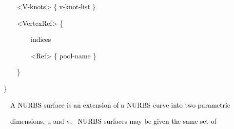\documentclass[a4paper]{article}
\newcommand\textstyleOOoComputerKeyWord[1]{\textrm{\textcolor[rgb]{0.0,0.0,0.5019608}{#1}}}
\newcommand\textstyleOOoAssemblerSpecialChar[1]{\textrm{\textcolor[rgb]{0.0,0.5019608,0.0}{#1}}}
\newcommand\textstyleOOoAssemblerIdent[1]{\textrm{\textcolor{black}{#1}}}
\newcommand\textstyleOOoAssemblerDirective[1]{\textrm{\textcolor[rgb]{0.0,0.5019608,1.0}{#1}}}
\begin{document}
{\color{black}
\textstyleOOoComputerKeyWord{\textcolor{black}{\ \ \ \ }}\textstyleOOoAssemblerSpecialChar{{\textless}}\textstyleOOoAssemblerIdent{V}\textstyleOOoAssemblerSpecialChar{{}-}\textstyleOOoAssemblerIdent{knots}\textstyleOOoAssemblerSpecialChar{{\textgreater}}\textstyleOOoComputerKeyWord{\textcolor{black}{
}}\textstyleOOoAssemblerSpecialChar{\{}\textstyleOOoComputerKeyWord{\textcolor{black}{
}}\textstyleOOoAssemblerIdent{v}\textstyleOOoAssemblerSpecialChar{{}-}\textstyleOOoAssemblerIdent{knot}\textstyleOOoAssemblerSpecialChar{{}-}\textstyleOOoAssemblerDirective{list}\textstyleOOoComputerKeyWord{\textcolor{black}{
}}\textstyleOOoAssemblerSpecialChar{\}}}


\bigskip

{\color{black}
\textstyleOOoComputerKeyWord{\textcolor{black}{\ \ \ \ }}\textstyleOOoAssemblerSpecialChar{{\textless}}\textstyleOOoAssemblerIdent{VertexRef}\textstyleOOoAssemblerSpecialChar{{\textgreater}}\textstyleOOoComputerKeyWord{\textcolor{black}{
}}\textstyleOOoAssemblerSpecialChar{\{}\textstyleOOoComputerKeyWord{\textcolor{black}{ }}}

{\color{black}
\textstyleOOoComputerKeyWord{\textcolor{black}{\ \ \ \ \ \ \ \ }}\textstyleOOoAssemblerIdent{indices}\textstyleOOoComputerKeyWord{\textcolor{black}{
}}}

{\color{black}
\textstyleOOoComputerKeyWord{\textcolor{black}{\ \ \ \ \ \ \ \ }}\textstyleOOoAssemblerSpecialChar{{\textless}}\textstyleOOoAssemblerIdent{Ref}\textstyleOOoAssemblerSpecialChar{{\textgreater}}\textstyleOOoComputerKeyWord{\textcolor{black}{
}}\textstyleOOoAssemblerSpecialChar{\{}\textstyleOOoComputerKeyWord{\textcolor{black}{
}}\textstyleOOoAssemblerIdent{pool}\textstyleOOoAssemblerSpecialChar{{}-}\textstyleOOoAssemblerDirective{name}\textstyleOOoComputerKeyWord{\textcolor{black}{
}}\textstyleOOoAssemblerSpecialChar{\}}\textstyleOOoComputerKeyWord{\textcolor{black}{ }}}

{\color{black}
\textstyleOOoComputerKeyWord{\textcolor{black}{\ \ \ \ }}\textstyleOOoAssemblerSpecialChar{\}}\textstyleOOoComputerKeyWord{\textcolor{black}{
}}}

{\color{black}
\textstyleOOoAssemblerSpecialChar{\}}}


\bigskip

{\color{black}
\textstyleOOoComputerKeyWord{\textcolor{black}{\ \ A NURBS surface is an extension of a NURBS curve into two
parametric}}}

{\color{black}
\textstyleOOoComputerKeyWord{\textcolor{black}{\ \ dimensions, u and v. \ NURBS surfaces may be given the same set of}}}
\end{document}
